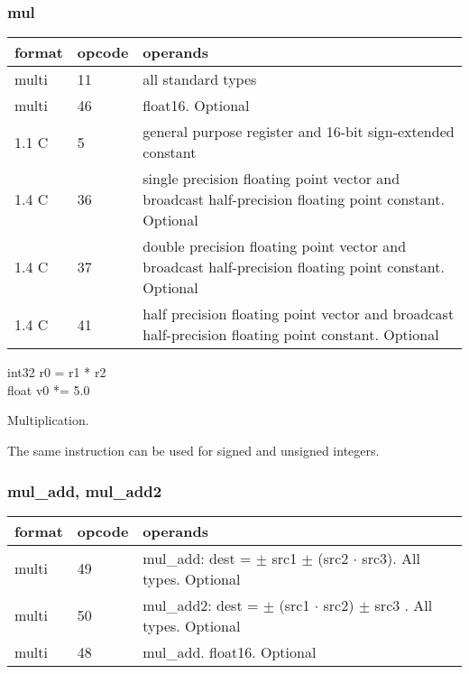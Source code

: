 \documentclass[forwardcom.tex]{subfiles}
\begin{document}
\subsubsection{mul}
\label{table:mulInstruction}
\begin{tabular}{|p{12mm}|p{12mm}|p{110mm}|}
\hline
\bfseries format & \bfseries opcode & \bfseries operands \\ \hline
multi & 11 & all standard types \\ \hline
multi & 46 & float16. Optional \\ \hline
1.1 C &  5 & general purpose register and 16-bit sign-extended constant \\ \hline
1.4 C & 36 & single precision floating point vector and broadcast half-precision floating point constant. Optional \\ \hline
1.4 C & 37 & double precision floating point vector and broadcast half-precision floating point constant. Optional \\ \hline
1.4 C & 41 & half precision floating point vector and broadcast half-precision floating point constant. Optional \\ \hline
\end{tabular}
\vspace{2mm}

int32 r0 = r1 * r2 \\
float v0 *= 5.0
\vspace{2mm}

Multiplication.
\vspace{2mm}

The same instruction can be used for signed and unsigned integers.

\subsubsection{mul\_add, mul\_add2}
\label{table:mulAddInstruction}
\begin{tabular}{|p{12mm}|p{12mm}|p{110mm}|}
\hline
\bfseries format & \bfseries opcode & \bfseries operands \\ \hline
multi & 49 & mul\_add: dest = $\pm$ src1 $\pm$ (src2 $\cdot$ src3). All types. Optional \\ 
multi & 50 & mul\_add2: dest = $\pm$ (src1 $\cdot$ src2) $\pm$ src3 . All types. Optional \\
multi & 48 & mul\_add. float16. Optional \\ \hline
\hline
\end{tabular}
\vspace{2mm}
\end{document}
